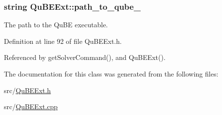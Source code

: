 \hypertarget{classQuBEExt_a02646118beb978edff16fc0094a798f8}{
\subsubsection[{path\-\_\-to\-\_\-qube\-\_\-}]{\setlength{\rightskip}{0pt plus 5cm}string Qu\-B\-E\-Ext\-::path\-\_\-to\-\_\-qube\-\_\-\hspace{0.3cm}{\ttfamily [protected]}}}\label{classQuBEExt_a02646118beb978edff16fc0094a798f8}


The path to the Qu\-B\-E executable. 



Definition at line 92 of file Qu\-B\-E\-Ext.\-h.



Referenced by get\-Solver\-Command(), and Qu\-B\-E\-Ext().



The documentation for this class was generated from the following files\-:\begin{DoxyCompactItemize}
\item 
src/\hyperlink{QuBEExt_8h}{Qu\-B\-E\-Ext.\-h}\item 
src/\hyperlink{QuBEExt_8cpp}{Qu\-B\-E\-Ext.\-cpp}\end{DoxyCompactItemize}
